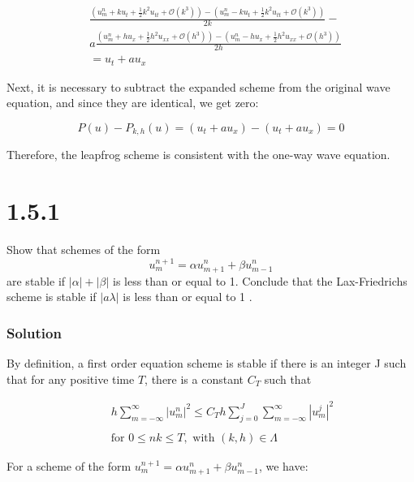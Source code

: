 \documentclass[12pt]{article}
\begin{document}
\begin{equation*}
\begin{aligned}
	&\frac{(u_m^n + ku_t + \frac{1}{2}k^2u_{tt} + \mathcal{O}(k^3))-(u_m^n - ku_t + \frac{1}{2}k^2u_{tt} + \mathcal{O}(k^3))}{2k} - \\
	&a\frac{(u_m^n + hu_x + \frac{1}{2}h^2u_{xx} + \mathcal{O}(h^3))-( u_m^n - hu_x + \frac{1}{2}h^2u_{xx} + \mathcal{O}(h^3))}{2h}\\
	&=u_t+au_x
\end{aligned}
\end{equation*}

Next, it is necessary to subtract the expanded scheme from the original wave equation, and since they are identical, we get zero:

$$ P(u) - P_{k,h}(u) = (u_t + au_x) - (u_t + au_x) = 0 $$

Therefore, the leapfrog scheme is consistent with the one-way wave equation.

\section*{1.5.1}

Show that schemes of the form
$$
u_{m}^{n+1}=\alpha u_{m+1}^{n}+\beta u_{m-1}^{n}
$$
are stable if $|\alpha|+|\beta|$ is less than or equal to 1. Conclude that the Lax-Friedrichs scheme is stable if $|a \lambda|$ is less than or equal to 1 .


\subsubsection*{Solution}

By definition, a first order equation scheme is stable if there is an integer J such that for any positive time $T$, there is a constant $C_T$ such that

$$
\begin{array}{l}
{\qquad h \sum_{m=-\infty}^{\infty}\left|u_{m}^{n}\right|^{2} \leq C_{T} h \sum_{j=0}^{J} \sum_{m=-\infty}^{\infty}\left|u_{m}^{j}\right|^{2}} \\
~\\
{\text { ~~~~~for } 0 \leq n k \leq T, \text { with }(k, h) \in \Lambda}
\end{array}
$$

For a scheme of the form $u_{m}^{n+1}=\alpha u_{m+1}^{n}+\beta u_{m-1}^{n}$, we have:
\end{document}
